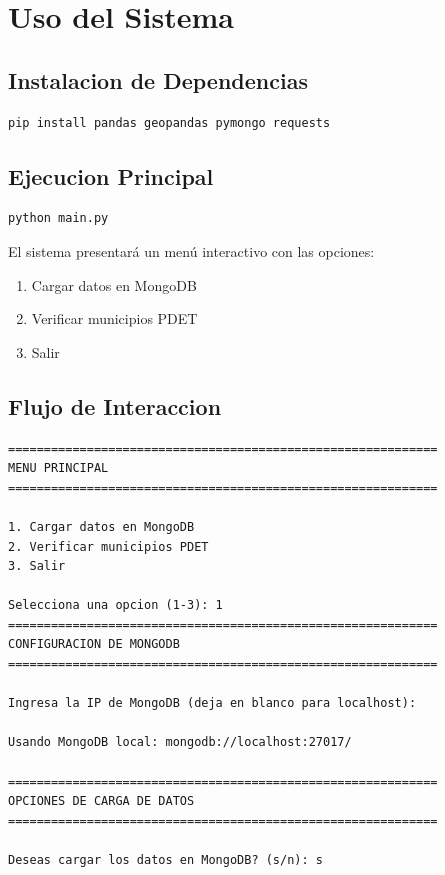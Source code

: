\documentclass[12pt,a4paper]{article}
\begin{document}
\section{Uso del Sistema}

\subsection{Instalacion de Dependencias}

\begin{lstlisting}[caption=Instalacion de paquetes requeridos]
pip install pandas geopandas pymongo requests
\end{lstlisting}

\subsection{Ejecucion Principal}

\begin{lstlisting}[caption=Ejecucion del programa]
python main.py
\end{lstlisting}

El sistema presentará un menú interactivo con las opciones:
\begin{enumerate}
  \item Cargar datos en MongoDB
  \item Verificar municipios PDET
  \item Salir
\end{enumerate}

\subsection{Flujo de Interaccion}

\begin{lstlisting}[caption=Ejemplo de flujo interactivo]
============================================================
MENU PRINCIPAL
============================================================

1. Cargar datos en MongoDB
2. Verificar municipios PDET
3. Salir

Selecciona una opcion (1-3): 1
============================================================
CONFIGURACION DE MONGODB
============================================================

Ingresa la IP de MongoDB (deja en blanco para localhost):

Usando MongoDB local: mongodb://localhost:27017/

============================================================
OPCIONES DE CARGA DE DATOS
============================================================

Deseas cargar los datos en MongoDB? (s/n): s
\end{lstlisting}
\end{document}
